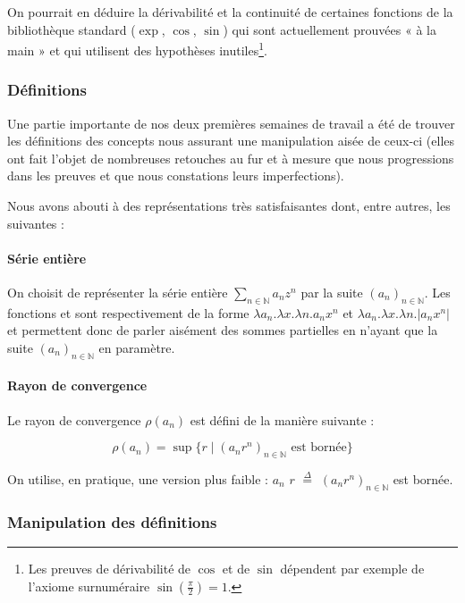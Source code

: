 On pourrait en déduire la dérivabilité et la continuité de certaines fonctions de la bibliothèque standard ($\exp$, $\cos$, $\sin$) qui sont actuellement prouvées « à la main » et qui utilisent des hypothèses inutiles\footnote{Les preuves de dérivabilité de $\cos$ et de $\sin$ dépendent par exemple de l'axiome surnuméraire $\sin\left(\frac{\pi}{2}\right) = 1$.}.

\subsubsection{Définitions}

Une partie importante de nos deux premières semaines de travail a été de trouver les définitions des concepts nous assurant une manipulation aisée de ceux-ci (elles ont fait l'objet de nombreuses retouches au fur et à mesure que nous progressions dans les preuves et que nous constations leurs imperfections).

Nous avons abouti à des représentations très satisfaisantes dont, entre autres, les suivantes :

\paragraph{Série entière} On choisit de représenter la série entière $\sum_{n\in \mathbb{N}} a_n z^n$ par la suite $\left(a_n\right)_{n\in \mathbb{N}}$. Les fonctions  et  sont respectivement de la forme $\lambda a_n.\lambda x.\lambda n.a_n x ^ n$ et $\lambda a_n.\lambda x.\lambda n.\left|a_n x ^ n\right|$ et permettent donc de parler aisément des sommes partielles en n'ayant que la suite $\left(a_n\right)_{n\in \mathbb{N}}$ en paramètre.

\paragraph{Rayon de convergence} Le rayon de convergence $\rho\left(a_n\right)$ est défini de la manière suivante :

$$\rho\left(a_n\right) = \sup \lbrace r \mid (a_n r^n)_{n\in \mathbb{N}} \text{ est bornée} \rbrace$$

\noindent On utilise, en pratique, une version plus faible :  $a_n$ $r$ $\stackrel{\Delta}{=}$ $\left(a_n r^n\right)_{n\in \mathbb{N}}$ est bornée.

\subsubsection{Manipulation des définitions}

